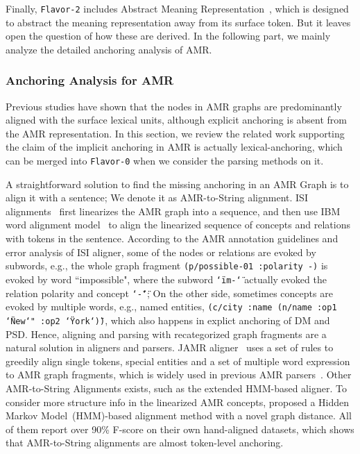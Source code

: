 Finally, \texttt{Flavor-2} includes Abstract Meaning
Representation~\cite[AMR,][]{Banarescu:LWPjKI7N}, which is designed to
abstract the meaning representation away from its surface token. But
it leaves open the question of how these are derived. In the following
part, we mainly analyze the detailed anchoring analysis of AMR.

\subsubsection{Anchoring Analysis for AMR}
\label{sssec:lex-phr:amr-anchor}
Previous studies have shown that the nodes in AMR graphs are
predominantly aligned with the surface lexical units, although
explicit anchoring is absent from the AMR representation.  In this
section, we review the related work supporting the claim of the
implicit anchoring in AMR is actually lexical-anchoring, which can be
merged into \texttt{Flavor-0} when we consider the parsing methods on
it.

 A straightforward solution to
find the missing anchoring in an AMR Graph is to align it with a
sentence; We denote it as AMR-to-String alignment. ISI
alignments~\cite{Pourdamghani:2014aligning} first linearizes the AMR
graph into a sequence, and then use IBM word alignment
model~\cite{brown1993mathematics} to align the linearized sequence of
concepts and relations with tokens in the sentence. According to the
AMR annotation guidelines and error analysis of ISI aligner, some of
the nodes or relations are evoked by subwords, e.g., the whole graph
fragment \texttt{(p/possible-01 :polarity -)} is evoked by word
``impossible", where the subword \texttt{\char`\"im-\char`\"} actually
evoked the relation polarity and concept \texttt{\char`\"-\char`\"};
On the other side, sometimes concepts are evoked by multiple words,
e.g., named entities, \texttt{(c/city :name (n/name :op1
  \char`\"New\char`" :op2 \char`\"York\char`\"))}, which also happens
in explict anchoring of DM and PSD. Hence, aligning and parsing with
recategorized graph fragments are a natural solution in aligners and
parsers. JAMR aligner~\cite{Flanigan:2014vc} uses a set of rules to
greedily align single tokens, special entities and a set of multiple
word expression to AMR graph fragments, which is widely used in
previous AMR
parsers~\cite[\eg][]{Flanigan:2014vc,Wang:2015uo,Artzi:2009tb,Pust:2015ug,Peng:2015tj,Konstas:2017uj,Wang:2017vt}. Other
AMR-to-String Alignments exists, such as the extended HMM-based
aligner. To consider more structure info in the linearized AMR
concepts, \citet{Wang:2017vt} proposed a Hidden Markov
Model~(HMM)-based alignment method with a novel graph distance. All of
them report over 90\% F-score on their own hand-aligned datasets,
which shows that AMR-to-String alignments are almost token-level
anchoring.

